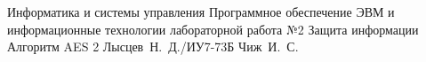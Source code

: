 \documentclass{bmstu}
\begin{document}
\makereporttitle
{Информатика и системы управления} %
{Программное обеспечение ЭВМ и информационные технологии}
{лабораторной работа №2} %
{Защита информации} %
{Алгоритм AES} %
{2} %
{Лысцев~Н.~Д./ИУ7-73Б} %
{Чиж~И.~С.} %
{}

\maketableofcontents



%
%
%
%

\makebibliography
\end{document}

